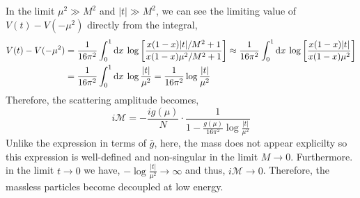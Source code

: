 \documentclass[12pt]{article}
\begin{document}
In the limit $\mu^2 \gg M^2$ and $|t| \gg M^2$, we can see the limiting value of $V(t) - V(-\mu^2)$ directly from the integral,
\begin{align*}
V(t) - V(-\mu^2) &= \frac{1}{16 \pi^2} \int_0^1 \mathrm{d}x \: \log{\left[\frac{x(1-x)|t|/M^2 + 1}{x(1-x) \mu^2/M^2 + 1}\right]} \approx \frac{1}{16 \pi^2} \int_0^1 \mathrm{d}x \: \log{\left[\frac{x(1-x)|t|}{x(1-x) \mu^2}\right]}
\\
& = \frac{1}{16 \pi^2} \int_0^1 \mathrm{d}x \: \log{\frac{|t|}{\mu^2}} = \frac{1}{16 \pi^2} \log{\frac{|t|}{\mu^2}} 
\end{align*}
Therefore, the scattering amplitude becomes,
\[ i\mathcal{M} = - \frac{i g(\mu)}{N} \cdot \frac{1}{1 - \frac{g(\mu)}{16 \pi^2} \log{\frac{|t|}{\mu^2}}} \]
Unlike the expression in terms of $\bar{g}$, here, the mass does not appear explicilty so this expression is well-defined and non-singular in the limit $M \to 0$. Furthermore. in the limit $t \to 0$ we have, $-\log{\frac{|t|}{\mu^2}} \to \infty$ and thus, $i \mathcal{M} \to 0$. Therefore, the massless particles become decoupled at low energy.
\end{document}
